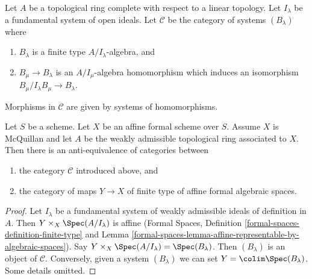 \noindent
Let $A$ be a topological ring complete with respect to a linear
topology. Let $I_\lambda$ be a fundamental system of open ideals.
Let $\mathcal{C}$ be the category of systems $(B_\lambda)$ where
\begin{enumerate}
\item $B_\lambda$ is a finite type $A/I_\lambda$-algebra, and
\item $B_\mu \to B_\lambda$ is an $A/I_\mu$-algebra homomorphism
which induces an isomorphism $B_\mu/I_\lambda B_\mu \to B_\lambda$.
\end{enumerate}
Morphisms in $\mathcal{C}$ are given by systems of homomorphisms.

\begin{lemma}
\label{lemma-category-affine-over}
Let $S$ be a scheme. Let $X$ be an affine formal scheme over $S$.
Assume $X$ is McQuillan and let $A$ be the weakly admissible topological
ring associated to $X$. Then there is an anti-equivalence of categories
between
\begin{enumerate}
\item the category $\mathcal{C}$ introduced above, and
\item the category of maps $Y \to X$ of finite type of
affine formal algebraic spaces.
\end{enumerate}
\end{lemma}

\begin{proof}
Let $I_\lambda$ be a fundamental system of weakly admissible ideals
of definition in $A$. Then $Y \times_X \Spec(A/I_\lambda)$ is
affine (Formal Spaces, Definition \ref{formal-spaces-definition-finite-type}
and Lemma \ref{formal-spaces-lemma-affine-representable-by-algebraic-spaces}).
Say $Y \times_X \Spec(A/I_\lambda) = \Spec(B_\lambda)$.
Then $(B_\lambda)$ is an object of $\mathcal{C}$.
Conversely, given a system $(B_\lambda)$ we can set
$Y = \colim \Spec(B_\lambda)$. Some details omitted.
\end{proof}


